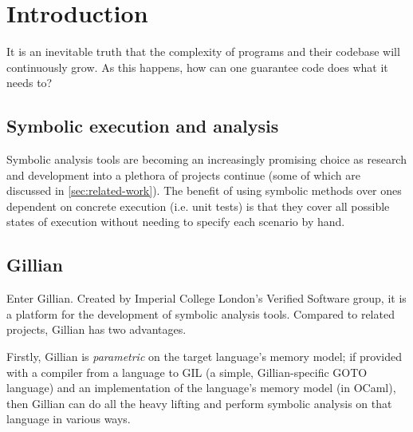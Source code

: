\chapter{Introduction}
\label{cha:intro}




It is an inevitable truth that the complexity of programs and their codebase will continuously grow. As this happens, how can one guarantee code does what it needs to?

\section{Symbolic execution and analysis}

Symbolic analysis tools are becoming an increasingly promising choice as research and development into a plethora of projects continue (some of which are discussed in \autoref{sec:related-work}). The benefit of using symbolic methods over ones dependent on concrete execution (i.e. unit tests) is that they cover all possible states of execution without needing to specify each scenario by hand.


\section{Gillian}
Enter Gillian. Created by Imperial College London's Verified Software group, it is a platform for the development of symbolic analysis tools. Compared to related projects, Gillian has two advantages.

Firstly, Gillian is \textit{parametric} on the target language's memory model; if provided with a compiler from a language to GIL (a simple, Gillian-specific GOTO language) and an implementation of the language's memory model (in OCaml), then Gillian can do all the heavy lifting and perform symbolic analysis on that language in various ways\cite{gillian-part1}.

